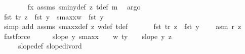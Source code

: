 \begin{isabellebody}
\ \ \ \ \ \ \isamarkupfalse%
\ fx\ assms\ s{}{\isacharunderscore}{\kern0pt}miny{\isacharunderscore}{\kern0pt}def\ z{}{\isacharparenleft}{\kern0pt}{}{\isacharparenright}{\kern0pt}\ t{\isacharunderscore}{\kern0pt}def\ m{}{\isacharparenleft}{\kern0pt}{}{\isacharparenright}{\kern0pt}\ \isamarkupfalse%
\ argo\isanewline
\ \ \ \ \isamarkupfalse%
\ {}{\isacharcolon}{\kern0pt}{\isachardoublequoteopen}fst\ {\isacharparenleft}{\kern0pt}{\isacharquery}{\kern0pt}tr\ z{}{\isacharparenright}{\kern0pt}\ {\isacharminus}{\kern0pt}\ fst\ y\ {\isasymle}\ s{}{\isacharunderscore}{\kern0pt}maxx{\isacharplus}{\kern0pt}{}{\isacharplus}{\kern0pt}w{}\ {\isacharminus}{\kern0pt}\ fst\ y{\isachardoublequoteclose}\isanewline
\ \ \ \ \ \ \isamarkupfalse%
\ {\isacharparenleft}{\kern0pt}simp\ add{\isacharcolon}{\kern0pt}\ assms\ s{}{\isacharunderscore}{\kern0pt}maxx{\isacharunderscore}{\kern0pt}def\ z{}{\isacharparenleft}{\kern0pt}{}{\isacharparenright}{\kern0pt}\ w{}{\isacharunderscore}{\kern0pt}def\ t{\isacharunderscore}{\kern0pt}def{\isacharparenright}{\kern0pt}\isanewline
\ \ \ \ \isamarkupfalse%
\ {}{\isacharcolon}{\kern0pt}\ {\isachardoublequoteopen}{\isacharparenleft}{\kern0pt}fst\ {\isacharparenleft}{\kern0pt}{\isacharquery}{\kern0pt}tr\ z{}{\isacharparenright}{\kern0pt}\ {\isacharminus}{\kern0pt}\ fst\ y{\isacharparenright}{\kern0pt}\ {\isachargreater}{\kern0pt}\ {}{\isachardoublequoteclose}\ \isamarkupfalse%
\ asm{\isacharparenleft}{\kern0pt}{}{\isacharcomma}{\kern0pt}{}{\isacharparenright}{\kern0pt}\ r{}\ z{}{\isacharparenleft}{\kern0pt}{}{\isacharparenright}{\kern0pt}\ \isamarkupfalse%
\ fastforce\isanewline
\ \ \ \ \isamarkupfalse%
\ {\isachardoublequoteopen}slope\ y\ {\isacharparenleft}{\kern0pt}s{}{\isacharunderscore}{\kern0pt}maxx\ {\isacharplus}{\kern0pt}\ {}\ {\isacharplus}{\kern0pt}\ w{}{\isacharcomma}{\kern0pt}\ ty{}\ {\isacharplus}{\kern0pt}\ {}{\isacharparenright}{\kern0pt}\ {\isasymle}\ slope\ y\ z{\isachardoublequoteclose}\ \isanewline
\ \ \ \ \ \ \isamarkupfalse%
\ {}\ {}\ {}\ {}\ slope{\isacharunderscore}{\kern0pt}def\ slope{\isacharunderscore}{\kern0pt}div{\isacharunderscore}{\kern0pt}ord\isanewline

\end{isabellebody}
